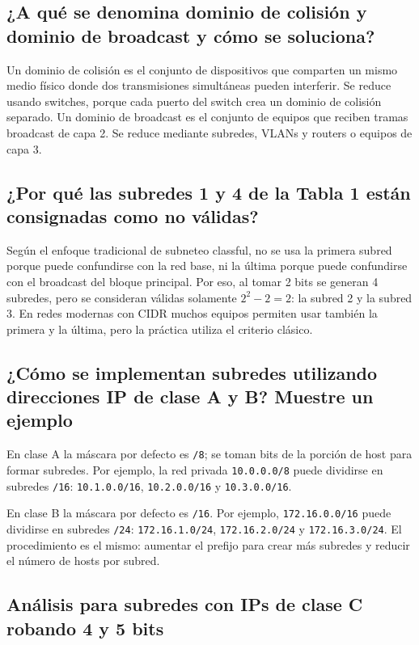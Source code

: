 \documentclass[a4paper,12pt]{article}
\newcommand{\ip}[1]{\mbox{\texttt{#1}}}
\begin{document}
\subsection{¿A qué se denomina dominio de colisión y dominio de broadcast y cómo se soluciona?}

Un dominio de colisión es el conjunto de dispositivos que comparten un mismo medio físico donde dos transmisiones simultáneas pueden interferir. Se reduce usando switches, porque cada puerto del switch crea un dominio de colisión separado. Un dominio de broadcast es el conjunto de equipos que reciben tramas broadcast de capa 2. Se reduce mediante subredes, VLANs y routers o equipos de capa 3.

\subsection{¿Por qué las subredes 1 y 4 de la Tabla 1 están consignadas como no válidas?}

Según el enfoque tradicional de subneteo classful, no se usa la primera subred porque puede confundirse con la red base, ni la última porque puede confundirse con el broadcast del bloque principal. Por eso, al tomar 2 bits se generan 4 subredes, pero se consideran válidas solamente $2^2 - 2 = 2$: la subred 2 y la subred 3. En redes modernas con CIDR muchos equipos permiten usar también la primera y la última, pero la práctica utiliza el criterio clásico.

\subsection{¿Cómo se implementan subredes utilizando direcciones IP de clase A y B? Muestre un ejemplo}

En clase A la máscara por defecto es \ip{/8}; se toman bits de la porción de host para formar subredes. Por ejemplo, la red privada \ip{10.0.0.0/8} puede dividirse en subredes \ip{/16}: \ip{10.1.0.0/16}, \ip{10.2.0.0/16} y \ip{10.3.0.0/16}.

En clase B la máscara por defecto es \ip{/16}. Por ejemplo, \ip{172.16.0.0/16} puede dividirse en subredes \ip{/24}: \ip{172.16.1.0/24}, \ip{172.16.2.0/24} y \ip{172.16.3.0/24}. El procedimiento es el mismo: aumentar el prefijo para crear más subredes y reducir el número de hosts por subred.

\subsection{Análisis para subredes con IPs de clase C robando 4 y 5 bits}
\end{document}
